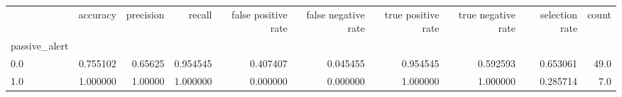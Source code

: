 \begin{tabular}{lrrrrrrrrr}
\toprule
{} &  accuracy &  precision &    recall &  false positive rate &  false negative rate &  true positive rate &  true negative rate &  selection rate &  count \\
passive\_alert &           &            &           &                      &                      &                     &                     &                 &        \\
\midrule
0.0           &  0.755102 &    0.65625 &  0.954545 &             0.407407 &             0.045455 &            0.954545 &            0.592593 &        0.653061 &   49.0 \\
1.0           &  1.000000 &    1.00000 &  1.000000 &             0.000000 &             0.000000 &            1.000000 &            1.000000 &        0.285714 &    7.0 \\
\bottomrule
\end{tabular}
